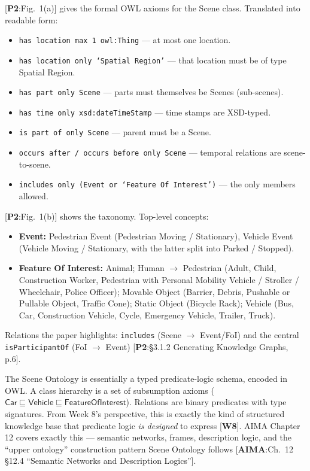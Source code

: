 \documentclass[11pt, a4paper]{article}
\newcommand{\paperref}[1]{\textcolor{srcBd}{\small[\textbf{P2}:#1]}}
\newcommand{\aimaref}[1]{\textcolor{srcBd}{\small[\textbf{AIMA}:#1]}}
\newcommand{\courseref}[1]{\textcolor{srcBd}{\small[\textbf{W#1}]}}
\begin{document}
\paperref{Fig.\ 1(a)} gives the formal OWL axioms for the Scene class. Translated into readable form:
\begin{itemize}[itemsep=0.1em]
  \item \texttt{has location max 1 owl:Thing} — at most one location.
  \item \texttt{has location only `Spatial Region'} — that location must be of type Spatial Region.
  \item \texttt{has part only Scene} — parts must themselves be Scenes (sub-scenes).
  \item \texttt{has time only xsd:dateTimeStamp} — time stamps are XSD-typed.
  \item \texttt{is part of only Scene} — parent must be a Scene.
  \item \texttt{occurs after / occurs before only Scene} — temporal relations are scene-to-scene.
  \item \texttt{includes only (Event or `Feature Of Interest')} — the only members allowed.
\end{itemize}

\paperref{Fig.\ 1(b)} shows the taxonomy. Top-level concepts:
\begin{itemize}[itemsep=0.1em]
  \item \textbf{Event:} Pedestrian Event (Pedestrian Moving / Stationary), Vehicle Event (Vehicle Moving / Stationary, with the latter split into Parked / Stopped).
  \item \textbf{Feature Of Interest:} Animal; Human \(\to\) Pedestrian (Adult, Child, Construction Worker, Pedestrian with Personal Mobility Vehicle / Stroller / Wheelchair, Police Officer); Movable Object (Barrier, Debris, Pushable or Pullable Object, Traffic Cone); Static Object (Bicycle Rack); Vehicle (Bus, Car, Construction Vehicle, Cycle, Emergency Vehicle, Trailer, Truck).
\end{itemize}

Relations the paper highlights: \texttt{includes} (Scene $\to$ Event/FoI) and the central \texttt{isParticipantOf} (FoI $\to$ Event) \paperref{§3.1.2 Generating Knowledge Graphs, p.6}.

\begin{notebox}[: ontology $=$ formal logical schema]
The Scene Ontology is essentially a typed predicate-logic schema, encoded in OWL. A class hierarchy is a set of subsumption axioms (\(\mathsf{Car} \sqsubseteq \mathsf{Vehicle} \sqsubseteq \mathsf{FeatureOfInterest}\)). Relations are binary predicates with type signatures. From Week 8's perspective, this is exactly the kind of structured knowledge base that predicate logic \emph{is designed} to express \courseref{8}. AIMA Chapter 12 covers exactly this — semantic networks, frames, description logic, and the ``upper ontology'' construction pattern Scene Ontology follows \aimaref{Ch.\ 12 §12.4 ``Semantic Networks and Description Logics''}.
\end{notebox}
\end{document}
